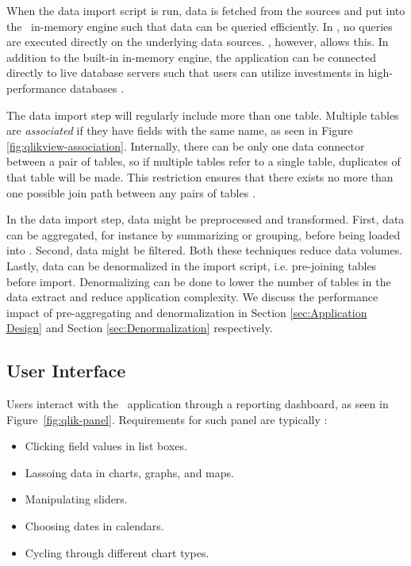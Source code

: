 When the data import script is run, data is fetched from the sources and put into the \qlikview~in-memory engine such that data can be queried efficiently. In \qlikview, no queries are executed directly on the underlying data sources. \tableau, however, allows this. In addition to the built-in in-memory engine, the application can be connected directly to live database servers such that users can utilize investments in high-performance databases \cite{Kamkolkar2015-iq}.



The data import step will regularly include more than one table. Multiple tables are \textit{associated} if they have fields with the same name, as seen in Figure \ref{fig:qlikview-association}. Internally, there can be only one data connector between a pair of tables, so if multiple tables refer to a single table, duplicates of that table will be made.
 This restriction ensures that there exists no more than one possible join path between any pairs of tables \cite{noauthor_undated-js}.

In the data import step, data might be preprocessed and transformed. First, data can be aggregated, for instance by summarizing or grouping, before being loaded into \qlikview. Second, data might be filtered. Both these techniques reduce data volumes. Lastly, data can be denormalized in the import script, i.e. pre-joining tables before import. Denormalizing can be done to lower the number of tables in the data extract and reduce application complexity. We discuss the performance impact of pre-aggregating and denormalization in Section \ref{sec:Application Design} and Section \ref{sec:Denormalization} respectively.

\subsection{User Interface}
\label{sub:User Interface}
Users interact with the \bd~application through a reporting dashboard, as seen in Figure~\ref{fig:qlik-panel}. Requirements for such panel are typically \cite{Qlik2014-vd}:
\begin{itemize}
  \item Clicking field values in list boxes.
  \item Lassoing data in charts, graphs, and maps.
  \item Manipulating sliders.
  \item Choosing dates in calendars.
  \item Cycling through different chart types.
\end{itemize}

